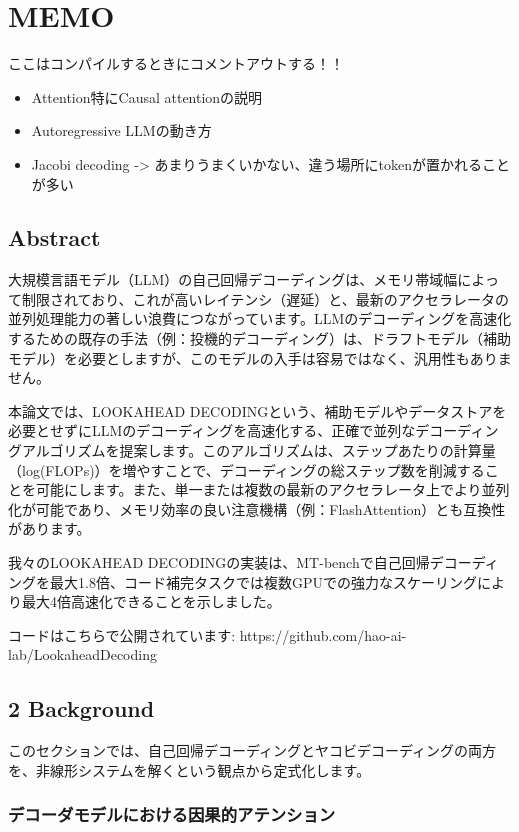 \documentclass[uplatex]{jsarticle}
\theoremstyle{remark}
\begin{document}
\section{MEMO}
ここはコンパイルするときにコメントアウトする！！
\begin{itemize}
    \item Attention特にCausal attentionの説明
    \item Autoregressive LLMの動き方
    \item Jacobi decoding -> あまりうまくいかない、違う場所にtokenが置かれることが多い
\end{itemize}
\subsection{Abstract}
大規模言語モデル（LLM）の自己回帰デコーディングは、メモリ帯域幅によって制限されており、これが高いレイテンシ（遅延）と、最新のアクセラレータの並列処理能力の著しい浪費につながっています。LLMのデコーディングを高速化するための既存の手法（例：投機的デコーディング）は、ドラフトモデル（補助モデル）を必要としますが、このモデルの入手は容易ではなく、汎用性もありません。

本論文では、LOOKAHEAD DECODINGという、補助モデルやデータストアを必要とせずにLLMのデコーディングを高速化する、正確で並列なデコーディングアルゴリズムを提案します。このアルゴリズムは、ステップあたりの計算量（log(FLOPs)）を増やすことで、デコーディングの総ステップ数を削減することを可能にします。また、単一または複数の最新のアクセラレータ上でより並列化が可能であり、メモリ効率の良い注意機構（例：FlashAttention）とも互換性があります。

我々のLOOKAHEAD DECODINGの実装は、MT-benchで自己回帰デコーディングを最大1.8倍、コード補完タスクでは複数GPUでの強力なスケーリングにより最大4倍高速化できることを示しました。

コードはこちらで公開されています: https://github.com/hao-ai-lab/LookaheadDecoding

\subsection{2 Background}
このセクションでは、自己回帰デコーディングとヤコビデコーディングの両方を、非線形システムを解くという観点から定式化します。

\subsubsection{デコーダモデルにおける因果的アテンション}
\end{document}
